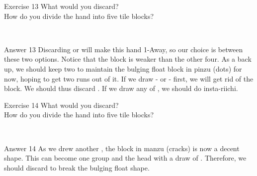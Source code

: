 \begin{itembox}[l]{Exercise 13}
What would you discard? \\
\vsp
How do you divide the hand into five tile blocks?

\vspace{-30pt}
\bp
{}\\ \vspace{-16pt}
\rfw{}
\ep
\end{itembox}

\newpage

\begin{itembox}[r]{Answer 13}
\emj
Discarding {\LARGE{}} or {\LARGE{}} will make this hand 1-Away, so our choice is between these two options. Notice that the {\LARGE{}} block is weaker than the other four. As a back up, we should keep two {\LARGE{}} to maintain the bulging float block in {\jap pinzu} (dots) for now, hoping to get two runs out of it. If we draw {\LARGE{}-} or {\LARGE{}-} first, we will get rid of the {\LARGE{}} block. We should thus discard {\LARGE{}}. If we draw any of {\LARGE{}}, we should do insta-riichi.
\end{itembox}

\vfill

\begin{itembox}[l]{Exercise 14}
What would you discard? \\
\vsp
How do you divide the hand into five tile blocks?

\vspace{-30pt}
\bp
{}\\ \vspace{-16pt}
\rfw{}
\ep
\end{itembox}

\newpage

\begin{itembox}[r]{Answer 14}
\emj
As we drew another {\LARGE{}}, the block in {\jap manzu} (cracks) is now a decent shape. This can become one group and the head with a draw of {\LARGE{}   }. Therefore, we should discard  {\LARGE{}} to break the bulging float shape.
\end{itembox}

